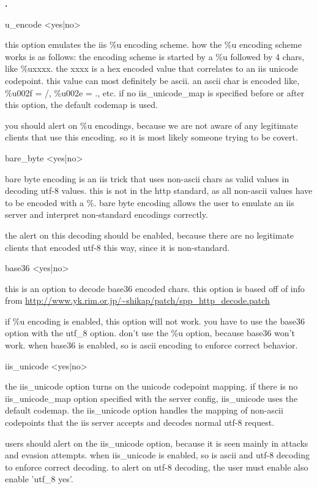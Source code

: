 \documentclass[english]{report}
\newcounter{slistnum}
\newenvironment{slist}{
    \begin{list}{
        {
            \bf \arabic{slistnum}.
        } 
    }{
        \usecounter{slistnum} 
    }
}{
    \end{list} 
}
\begin{document}
\begin{slist}
\item u\_encode <yes|no>

this option emulates the iis \%u encoding scheme.  how the \%u encoding scheme
works is as follows:  the encoding scheme is started by a \%u followed by 4
chars, like \%uxxxx.  the xxxx is a hex encoded value that correlates to an iis
unicode codepoint.  this value can most definitely be ascii.  an ascii char is
encoded like, \%u002f = /, \%u002e = ., etc.  if no iis\_unicode\_map is specified
before or after this option, the default codemap is used.

you should alert on \%u encodings, because we are not aware of any legitimate
clients that use this encoding.  so it is most likely someone trying to be
covert.

\item bare\_byte <yes|no>

bare byte encoding is an iis trick that uses non-ascii chars as valid values in
decoding utf-8 values.  this is not in the http standard, as all non-ascii
values have to be encoded with a \%.  bare byte encoding allows the user to
emulate an iis server and interpret non-standard encodings correctly.

the alert on this decoding should be enabled, because there are no legitimate
clients that encoded utf-8 this way, since it is non-standard.

\item base36 <yes|no>

this is an option to decode base36 encoded chars.  this option is based off of
info from 
\url{http://www.yk.rim.or.jp/~shikap/patch/spp\_http\_decode.patch}

if \%u encoding is enabled, this option will not work.  you have to use the
base36 option with the utf\_8 option.  don't use the \%u option, because base36
won't work.  when base36 is enabled, so is ascii encoding to enforce correct
behavior.

\item iis\_unicode <yes|no>

the iis\_unicode option turns on the unicode codepoint mapping.  if there is no
iis\_unicode\_map option specified with the server config, iis\_unicode uses the
default codemap.  the iis\_unicode option handles the mapping of non-ascii
codepoints that the iis server accepts and decodes normal utf-8 request.

users should alert on the iis\_unicode option, because it is seen mainly in
attacks and evasion attempts.  when iis\_unicode is enabled, so is ascii and
utf-8 decoding to enforce correct decoding.  to alert on utf-8 decoding, the
user must enable also enable 'utf\_8 yes'. 


\end{slist}
\end{document}
